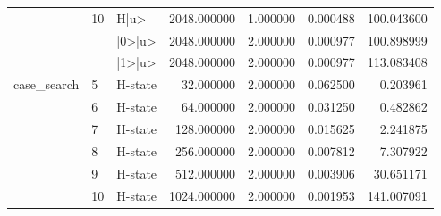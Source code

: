 \begin{table}
\begin{tabular}{lllrrrr}
 & \multirow[c]{3}{*}{10} & H|u> & 2048.000000 & 1.000000 & 0.000488 & 100.043600 \\
 &  & |0>|u> & 2048.000000 & 2.000000 & 0.000977 & 100.898999 \\
 &  & |1>|u> & 2048.000000 & 2.000000 & 0.000977 & 113.083408 \\
\multirow[c]{6}{*}{case_search} & 5 & H-state & 32.000000 & 2.000000 & 0.062500 & 0.203961 \\
 & 6 & H-state & 64.000000 & 2.000000 & 0.031250 & 0.482862 \\
 & 7 & H-state & 128.000000 & 2.000000 & 0.015625 & 2.241875 \\
 & 8 & H-state & 256.000000 & 2.000000 & 0.007812 & 7.307922 \\
 & 9 & H-state & 512.000000 & 2.000000 & 0.003906 & 30.651171 \\
 & 10 & H-state & 1024.000000 & 2.000000 & 0.001953 & 141.007091 \\
\bottomrule
\end{tabular}
\end{table}
